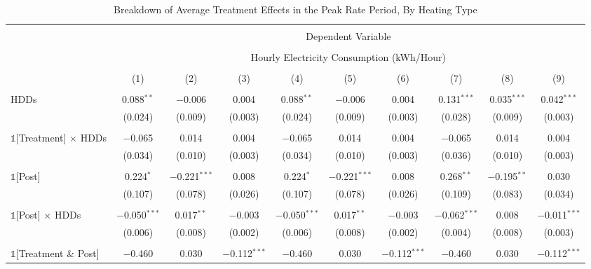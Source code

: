 
\begin{table}[!htbp] \centering 
  \caption{Breakdown of Average Treatment Effects in the Peak Rate Period, By Heating Type} 
  \label{Table:Breakdown-of-Average-Treatment-Effects-in-the-Peak-Rate-Period_By-Heating-Type} 
\small 
\begin{tabular}{@{\extracolsep{20pt}}lccccccccc} 
\\[-1.8ex]\hline 
\hline \\[-1.8ex] 
 & \multicolumn{9}{c}{Dependent Variable} \\ 
\cline{2-10} 
\\[-1.8ex] & \multicolumn{9}{c}{Hourly Electricity Consumption  (kWh/Hour)} \\ 
\\[-1.8ex] & (1) & (2) & (3) & (4) & (5) & (6) & (7) & (8) & (9)\\ 
\hline \\[-1.8ex] 
 HDDs & 0.088$^{**}$ & $-$0.006 & 0.004 & 0.088$^{**}$ & $-$0.006 & 0.004 & 0.131$^{***}$ & 0.035$^{***}$ & 0.042$^{***}$ \\ 
  & (0.024) & (0.009) & (0.003) & (0.024) & (0.009) & (0.003) & (0.028) & (0.009) & (0.003) \\ 
  & & & & & & & & & \\ 
 $\mathbb{1}$[Treatment] $\times$ HDDs & $-$0.065 & 0.014 & 0.004 & $-$0.065 & 0.014 & 0.004 & $-$0.065 & 0.014 & 0.004 \\ 
  & (0.034) & (0.010) & (0.003) & (0.034) & (0.010) & (0.003) & (0.036) & (0.010) & (0.003) \\ 
  & & & & & & & & & \\ 
 $\mathbb{1}$[Post] & 0.224$^{*}$ & $-$0.221$^{***}$ & 0.008 & 0.224$^{*}$ & $-$0.221$^{***}$ & 0.008 & 0.268$^{**}$ & $-$0.195$^{**}$ & 0.030 \\ 
  & (0.107) & (0.078) & (0.026) & (0.107) & (0.078) & (0.026) & (0.109) & (0.083) & (0.034) \\ 
  & & & & & & & & & \\ 
 $\mathbb{1}$[Post] $\times$ HDDs & $-$0.050$^{***}$ & 0.017$^{**}$ & $-$0.003 & $-$0.050$^{***}$ & 0.017$^{**}$ & $-$0.003 & $-$0.062$^{***}$ & 0.008 & $-$0.011$^{***}$ \\ 
  & (0.006) & (0.008) & (0.002) & (0.006) & (0.008) & (0.002) & (0.004) & (0.008) & (0.003) \\ 
  & & & & & & & & & \\ 
 $\mathbb{1}$[Treatment \& Post] & $-$0.460 & 0.030 & $-$0.112$^{***}$ & $-$0.460 & 0.030 & $-$0.112$^{***}$ & $-$0.460 & 0.030 & $-$0.112$^{***}$ \\ 

\end{tabular}
\end{table}
